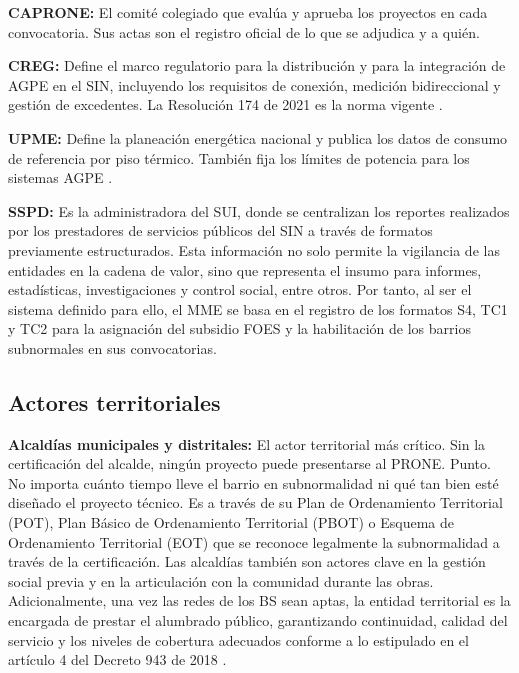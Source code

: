 \textbf{CAPRONE:} El comité colegiado que evalúa y aprueba los proyectos
en cada convocatoria. Sus actas son el registro oficial de lo que se
adjudica y a quién.

\textbf{CREG:} Define el marco regulatorio para la distribución y para
la integración de AGPE en el SIN, incluyendo los requisitos de conexión,
medición bidireccional y gestión de excedentes. La Resolución 174 de 2021
es la norma vigente \parencite{ResolucionCREG174_2021}.

\textbf{UPME:} Define la planeación energética nacional y publica los
datos de consumo de referencia por piso térmico. También fija los límites
de potencia para los sistemas AGPE \parencite{UPME2025}.

\textbf{SSPD:} Es la administradora del SUI, donde se centralizan los
reportes realizados por los prestadores de servicios públicos del SIN a
través de formatos previamente estructurados. Esta información no solo
permite la vigilancia de las entidades en la cadena de valor, sino que
representa el insumo para informes, estadísticas, investigaciones y
control social, entre otros. Por tanto, al ser el sistema definido para
ello, el MME se basa en el registro de los formatos S4, TC1 y TC2 para
la asignación del subsidio FOES y la habilitación de los barrios
subnormales en sus convocatorias.

\subsection{Actores territoriales}
\label{subsec:actores_territoriales}

\textbf{Alcaldías municipales y distritales:} El actor territorial más
crítico. Sin la certificación del alcalde, ningún proyecto puede
presentarse al PRONE. Punto. No importa cuánto tiempo lleve el barrio en
subnormalidad ni qué tan bien esté diseñado el proyecto técnico. Es a
través de su Plan de Ordenamiento Territorial (POT), Plan Básico de
Ordenamiento Territorial (PBOT) o Esquema de Ordenamiento Territorial
(EOT) que se reconoce legalmente la subnormalidad a través de la
certificación. Las alcaldías también son actores clave en la gestión
social previa y en la articulación con la comunidad durante las obras.
Adicionalmente, una vez las redes de los BS sean aptas, la entidad
territorial es la encargada de prestar el alumbrado público, garantizando
continuidad, calidad del servicio y los niveles de cobertura adecuados
conforme a lo estipulado en el artículo 4 del Decreto 943 de 2018
\parencite{Decreto943_2018}.

